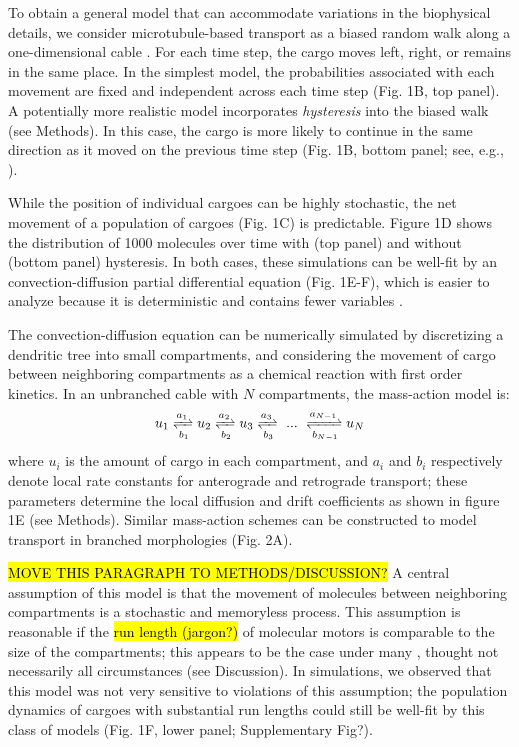 \documentclass[10pt]{wlpeerj}
\begin{document}
To obtain a general model that can accommodate variations in the biophysical details, we consider microtubule-based transport as a biased random walk along a one-dimensional cable \citep{Bressloff_2006,Newby_2010,Bressloff_2009}.
For each time step, the cargo moves left, right, or remains in the same place.
In the simplest model, the probabilities associated with each movement are fixed and independent across each time step (Fig. 1B, top panel).
A potentially more realistic model incorporates \textit{hysteresis} into the biased walk (see Methods). In this case, the cargo is more likely to continue in the same direction as it moved on the previous time step (Fig. 1B, bottom panel; see, e.g., \cite{Soundararajan_2014}).

While the position of individual cargoes can be highly stochastic, the net movement of a population of cargoes (Fig. 1C) is predictable.
Figure 1D shows the distribution of 1000 molecules over time with (top panel) and without (bottom panel) hysteresis.
In both cases, these simulations can be well-fit by an convection-diffusion partial differential equation (Fig. 1E-F), which is easier to analyze because it is deterministic and contains fewer variables \citep{Smith_2001}.

The convection-diffusion equation can be numerically simulated by discretizing a dendritic tree into small compartments, and considering the movement of cargo between neighboring compartments as a chemical reaction with first order kinetics. In an unbranched cable with $N$ compartments, the mass-action model is:
\begin{equation}
u_1 \xrightleftharpoons[b_1]{a_1} u_2 \xrightleftharpoons[b_2]{a_2} u_3 \xrightleftharpoons[b_3]{a_3} ~...~ \xrightleftharpoons[b_{N-1}]{a_{N-1}} u_N
\end{equation}
where $u_i$ is the amount of cargo in each compartment, and $a_i$ and $b_i$ respectively denote local rate constants for anterograde and retrograde transport; these parameters determine the local diffusion and drift coefficients as shown in figure 1E (see Methods). Similar mass-action schemes can be constructed to model transport in branched morphologies (Fig. 2A).

\hl{MOVE THIS PARAGRAPH TO METHODS/DISCUSSION?} A central assumption of this model is that the movement of molecules between neighboring compartments is a stochastic and memoryless process. This assumption is reasonable if the \hl{run length (jargon?)} of molecular motors is comparable to the size of the compartments; this appears to be the case under many \citep{Muller_2008,Verbrugge_2009}, thought not necessarily all \citep{Dynes_2007} circumstances (see Discussion). In simulations, we observed that this model was not very sensitive to violations of this assumption; the population dynamics of cargoes with substantial run lengths could still be well-fit by this class of models (Fig. 1F, lower panel; Supplementary Fig?).
\end{document}
